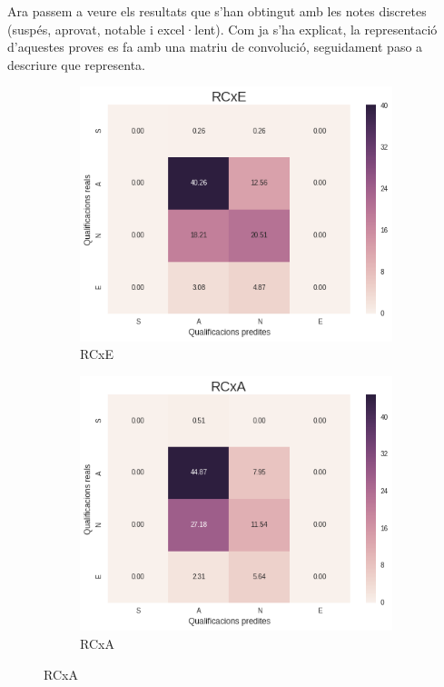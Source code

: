 \documentclass[12pt,a4paper,catalan]{article}
\begin{document}
\newpage

Ara passem a veure els resultats que s'han obtingut amb les notes discretes (suspés, aprovat, notable i excel·lent). Com ja s'ha explicat, la representació d'aquestes proves es fa amb una matriu de convolució, seguidament paso a descriure que representa.

\begin{figure}[h]
\centering
\begin{subfigure}{.48\textwidth}
  \centering
  \includegraphics[width=\linewidth]{img/heatmap_rcxe_primer_segon.png}
  \caption{RCxE}
\end{subfigure}
\begin{subfigure}{.48\textwidth}
  \centering
  \includegraphics[width=\linewidth]{img/heatmap_rcxa_primer_segon.png}
  \caption{RCxA}
\end{subfigure}
\end{figure}
\end{document}
